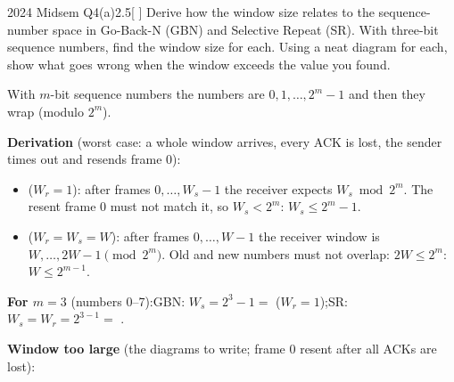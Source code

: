 \begin{question}{2024 Midsem Q4(a)}{2.5}[ ]
Derive how the window size relates to the sequence-number space in Go-Back-N (GBN) and Selective Repeat (SR). With three-bit sequence numbers, find the window size for each. Using a neat diagram for each, show what goes wrong when the window exceeds the value you found.
\end{question}
\label{q:MS2024-4a}
\begin{solution}
With $m$-bit sequence numbers the numbers are $0,1,\dots,2^m-1$ and then they wrap (modulo $2^m$). 

\textbf{Derivation} (worst case: a whole window arrives, every ACK is lost, the sender times out and resends frame 0):
\begin{itemize}
  \item {} ($W_r=1$): after frames $0,\dots,W_s-1$ the receiver expects $W_s \bmod 2^m$. The resent frame 0 must not match it, so $W_s<2^m$: \quad $W_s \le 2^m-1$.
  \item {} ($W_r=W_s=W$): after frames $0,\dots,W-1$ the receiver window is $W,\dots,2W-1 \pmod{2^m}$. Old and new numbers must not overlap: $2W\le 2^m$: \quad $W \le 2^{m-1}$.
\end{itemize}
\textbf{For $m=3$} (numbers 0--7):\quad GBN: $W_s = 2^3-1=$  ($W_r=1$);\quad SR: $W_s=W_r=2^{3-1}=$ .

\textbf{Window too large} (the diagrams to write; frame 0 resent after all ACKs are lost):


\end{solution}
